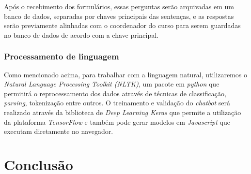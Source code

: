 \documentclass[
	12pt,				%
	oneside,
	a4paper,			%
	english,			%
	french,				%
	spanish,			%
	brazil				%
	]{abntex2}
\begin{document}
Após o recebimento dos formulários, essas perguntas serão arquivadas em um banco de dados, separadas por chaves principais das sentenças, e as respostas serão previamente alinhadas com o coordenador do curso para serem guardadas no banco de dados de acordo com a chave principal.

\section{Processamento de linguagem}

Como mencionado acima, para trabalhar com a linguagem natural, utilizaremos  o \emph{Natural Language Processing Toolkit (NLTK)}, um pacote em \emph{python} que permitirá o reprocessamento dos dados através de técnicas de classificação, \emph{parsing}, tokenização entre outros.
O treinamento e validação do \emph{chatbot} será realizado através da biblioteca de \emph{Deep Learning Keras} que permite a utilização da plataforma \emph{TensorFlow} e também pode gerar modelos em \emph{Javascript} que executam diretamente no navegador. 



\part{Conclusão}


\end{document}
